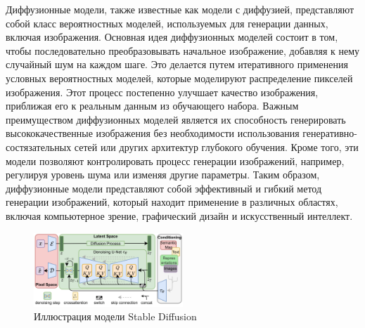 Диффузионные модели, также известные как модели с диффузией, представляют собой класс вероятностных моделей, используемых для генерации данных, включая изображения.
Основная идея диффузионных моделей состоит в том, чтобы последовательно преобразовывать начальное изображение, добавляя к нему случайный шум на каждом шаге. Это делается путем итеративного применения условных вероятностных моделей, которые моделируют распределение пикселей изображения. Этот процесс постепенно улучшает качество изображения, приближая его к реальным данным из обучающего набора.
Важным преимуществом диффузионных моделей является их способность генерировать высококачественные изображения без необходимости использования генеративно-состязательных сетей или других архитектур глубокого обучения. Кроме того, эти модели позволяют контролировать процесс генерации изображений, например, регулируя уровень шума или изменяя другие параметры.
Таким образом, диффузионные модели представляют собой эффективный и гибкий метод генерации изображений, который находит применение в различных областях, включая компьютерное зрение, графический дизайн и искусственный интеллект.


\begin{figure}[h]
    \centering
    \includegraphics[width=0.5\textwidth]{assets/generation/stable_diffusion.png}
    \caption{Иллюстрация модели Stable Diffusion \cite{stablediffusion}}
    \label{sd_arch}
\end{figure}